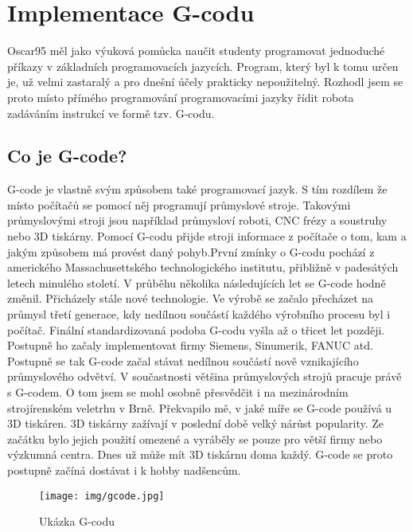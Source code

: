     \chapter{Implementace G-codu}Oscar95 měl jako výuková pomůcka naučit studenty programovat jednoduché příkazy v základních programovacích jazycích. Program, který byl k tomu určen je, už velmi zastaralý a pro dnešní účely prakticky nepoužitelný. Rozhodl jsem se proto místo přímého programování programovacími jazyky řídit robota zadáváním instrukcí ve formě tzv. G-codu. 
    
    \section{Co je G-code?}
    G-code je vlastně svým způsobem také programovací jazyk. S tím rozdílem že místo počítačů se pomocí něj programují průmyslové stroje. Takovými průmyslovými stroji jsou například průmysloví roboti, CNC frézy a soustruhy nebo 3D tiskárny. Pomocí G-codu přijde stroji informace z počítače o tom, kam a jakým způsobem má provést daný pohyb.První zmínky o G-codu pochází z amerického Massachusettského technologického institutu, přibližně v padesátých letech minulého století. V průběhu několika následujících let se G-code hodně změnil. Přicházely stále nové technologie. Ve výrobě se začalo přecházet na průmysl třetí generace, kdy nedílnou součástí každého výrobního procesu byl i počítač. Finální standardizovaná podoba G-codu vyšla až o třicet let později. Postupně ho začaly implementovat firmy Siemens, Sinumerik, FANUC atd. Postupně se tak G-code začal stávat nedílnou součástí nově vznikajícího průmyslového odvětví. V součastnosti většina prů\-myslových strojů pracuje právě s G-codem. O tom jsem se mohl osobně přesvědčit i na mezinárodním strojírenském veletrhu v Brně. Překvapilo mě, v jaké míře se G-code používá u 3D tiskáren. 3D tiskárny zažívají v poslední době velký nárůst popularity. Ze začátku bylo jejich použití omezené a vyráběly se pouze pro větší firmy nebo výzkumná centra. Dnes už může mít 3D tiskárnu doma každý.  G-code se proto  postupně začíná dostávat i k hobby nadšencům. \cite{G-code-wiki} \cite{G-code-explained}
    
    	\begin{figure}
    		\begin{center}
    			\texttt{[image: img/gcode.jpg]}
    			\caption{Ukázka G-codu \cite{G-code-foto}}
    			\label{fig:gcode}
    		\end{center}
    		\vspace{-2mm}
    	\end{figure}
    
